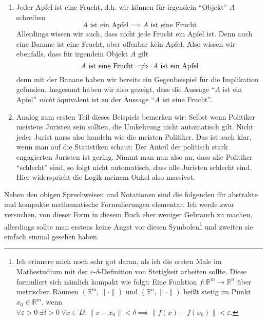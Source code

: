 \begin{example}
    \begin{enumerate}[label=(\arabic*)]
        \item Jeder Apfel ist eine Frucht, d.h. wir können für irgendein "`Objekt"' \(A\) schreiben 
        \begin{equation*}
            A \text{ ist ein Apfel} \implies A \text{ ist eine Frucht}
        \end{equation*}
        Allerdings wissen wir auch, dass nicht jede Frucht ein Apfel ist. Denn auch eine Banane ist eine Frucht, aber offenbar kein Apfel. Also wissen wir ebenfalls, dass für irgendein Objekt \(A\) gilt 
        \begin{equation*}
            A \text{ ist eine Frucht} \centernot\implies A \text{ ist ein Apfel}
        \end{equation*}
        denn mit der Banane haben wir bereits ein Gegenbeispiel für die Implikation gefunden. Insgesamt haben wir also gezeigt, dass die Aussage "`\(A\) ist ein Apfel"' \textit{nicht} äquivalent ist zu der Aussage "`\(A\) ist eine Frucht"'. 

        \item Analog zum ersten Teil dieses Beispiels bemerken wir: Selbst wenn Politiker meistens Juristen sein sollten, die Umkehrung nicht automatisch gilt. Nicht jeder Jurist muss also handeln wie die meisten Politiker. Das ist auch klar, wenn man auf die Statistiken schaut: Der Anteil der politisch stark engagierten Juristen ist gering. Nimmt man nun also an, dass alle Politiker "`schlecht"' sind, so folgt nicht automatisch, dass alle Juristen schlecht sind. Hier widerspricht die Logik meinem Onkel also massivst. 
    \end{enumerate}
\end{example}

\begin{definition}
    
\end{definition}

Neben den obigen Sprechweisen und Notationen sind die folgenden für abstrakte und kompakte mathematische Formulierungen elementar. Ich werde zwar versuchen, von dieser Form in diesem Buch eher weniger Gebrauch zu machen, allerdings sollte man erstens keine Angst vor diesen Symbolen\footnote{Ich erinnere mich noch sehr gut daran, als ich die ersten Male im Mathestudium mit der \(\varepsilon\)-\(\delta\)-Definition von Stetigkeit arbeiten sollte. Diese formuliert sich nämlich kompakt wie folgt: Eine Funktion \(f:\mathbb R^m\to\mathbb R^n\) über metrischen Räumen \((\mathbb R^m, \|\cdot\|)\) und \((\mathbb R^n, \|\cdot\|)\) heißt stetig im Punkt \(x_0 \in \mathbb R^m\), wenn \(\forall \varepsilon>0 \: \exists \delta >0 \: \forall x \in D: \|x-x_0\|< \delta \implies \|f(x) - f(x_0)\|< \varepsilon\). } und zweiten sie einfach einmal gesehen haben. 

